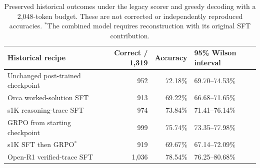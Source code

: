 \begin{table}[ht]
\centering
\small
\begin{tabular}{@{}lrrl@{}}
\toprule
Historical recipe & Correct / 1,319 & Accuracy & 95\% Wilson interval \\
\midrule
Unchanged post-trained checkpoint & 952 & 72.18\% & 69.70--74.53\% \\
Orca worked-solution SFT & 913 & 69.22\% & 66.68--71.65\% \\
s1K reasoning-trace SFT & 974 & 73.84\% & 71.41--76.14\% \\
GRPO from starting checkpoint & 999 & 75.74\% & 73.35--77.98\% \\
s1K SFT then GRPO$^*$ & 919 & 69.67\% & 67.14--72.09\% \\
Open-R1 verified-trace SFT & 1,036 & 78.54\% & 76.25--80.68\% \\
\bottomrule
\end{tabular}
\caption{Preserved historical outcomes under the legacy scorer and greedy decoding with a 2,048-token budget. These are not corrected or independently reproduced accuracies. $^*$The combined model requires reconstruction with its original SFT contribution.}
\end{table}
